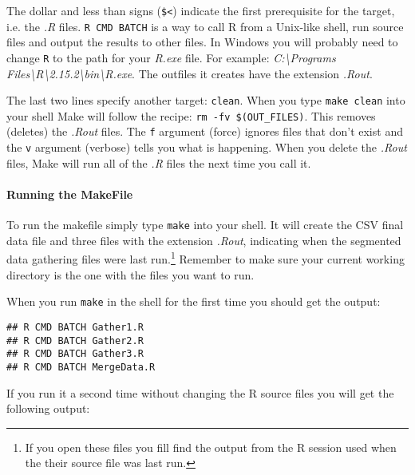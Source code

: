 The dollar and less than signs (\verb|$<|) indicate the first prerequisite for the target, i.e. the \emph{.R} files. \texttt{R CMD BATCH} is a way to call R from a Unix-like shell, run source files and output the results to other files. In Windows you will probably need to change \texttt{R} to the path for your \emph{R.exe} file. For example: \emph{C:\textbackslash{}Programs Files\textbackslash{}R\textbackslash{}2.15.2\textbackslash{}bin\textbackslash{}R.exe}. The outfiles it creates have the extension \emph{.Rout}.

The last two lines specify another target: \texttt{clean}. When you type \texttt{make clean} into your shell Make will follow the recipe: \verb|rm -fv $(OUT_FILES)|. This removes (deletes) the \emph{.Rout} files. The \texttt{f} argument (force) ignores  files that don't exist and the \texttt{v} argument (verbose) tells you what is happening. When you delete the \emph{.Rout} files, Make will run all of the \emph{.R} files the next time you call it.

\paragraph{Running the MakeFile}

To run the makefile simply type \texttt{make} into your shell. It will create the CSV final data file and three files with the extension \emph{.Rout}, indicating when the segmented data gathering files were last run.\footnote{If you open these files you fill find the output from the R session used when the their source file was last run.} Remember to make sure your current working directory is the one with the files you want to run. 

When you run \verb|make| in the shell for the first time you should get the output:

\begin{knitrout}
	\color{fgcolor}
	\begin{kframe}
		\begin{verbatim}
## R CMD BATCH Gather1.R
## R CMD BATCH Gather2.R
## R CMD BATCH Gather3.R
## R CMD BATCH MergeData.R
			\end{verbatim}
		\end{kframe}
\end{knitrout}

\noindent If you run it a second time without changing the R source files you will get the following output:

